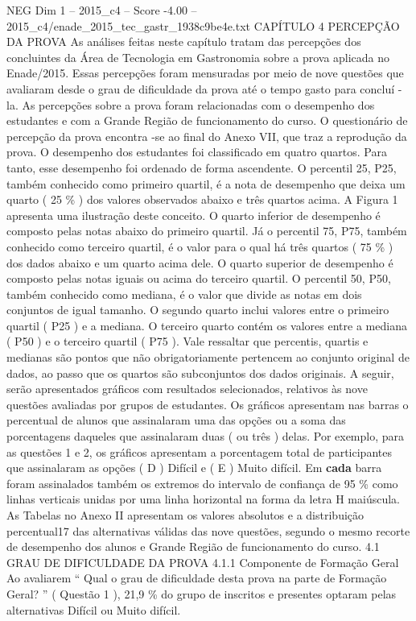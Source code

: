 \begin{textsample}{NEG Dim 1 – 2015\_c4 – Score -4.00 – 2015\_c4/enade\_2015\_tec\_gastr\_1938c9be4e.txt}  \label{ex:f1_neg_109}
CAPÍTULO 4 PERCEPÇÃO DA PROVA As análises feitas neste capítulo tratam das percepções dos concluintes da Área de Tecnologia em Gastronomia sobre a prova aplicada no Enade/2015.
Essas percepções foram mensuradas por meio de nove questões que avaliaram desde o grau de dificuldade da prova até o tempo gasto para concluí -la.
As percepções sobre a prova foram relacionadas com o desempenho dos estudantes e com a Grande Região de funcionamento do curso.
O questionário de percepção da prova encontra -se ao final do Anexo VII, que traz a reprodução da prova.
O desempenho dos estudantes foi classificado em quatro quartos.
Para tanto, esse desempenho foi ordenado de forma ascendente.
O percentil 25, P25, também conhecido como primeiro quartil, é a nota de desempenho que deixa um quarto ( 25 \% ) dos valores observados abaixo e três quartos acima.
A Figura 1 apresenta uma ilustração deste conceito.
O quarto inferior de desempenho é composto pelas notas abaixo do primeiro quartil.
Já o percentil 75, P75, também conhecido como terceiro quartil, é o valor para o qual há três quartos ( 75 \% ) dos dados abaixo e um quarto acima dele.
O quarto superior de desempenho é composto pelas notas iguais ou acima do terceiro quartil.
O percentil 50, P50, também conhecido como mediana, é o valor que divide as notas em dois conjuntos de igual tamanho.
O segundo quarto inclui valores entre o primeiro quartil ( P25 ) e a mediana.
O terceiro quarto contém os valores entre a mediana ( P50 ) e o terceiro quartil ( P75 ).
Vale ressaltar que percentis, quartis e medianas são pontos que não obrigatoriamente pertencem ao conjunto original de dados, ao passo que os quartos são subconjuntos dos dados originais.
A seguir, serão apresentados gráficos com resultados selecionados, relativos às nove questões avaliadas por grupos de estudantes.
Os gráficos apresentam nas barras o percentual de alunos que assinalaram uma das opções ou a soma das porcentagens daqueles que assinalaram duas ( ou três ) delas.
Por exemplo, para as questões 1 e 2, os gráficos apresentam a porcentagem total de participantes que assinalaram as opções ( D ) Difícil e ( E ) Muito difícil.
Em \textbf{cada} barra foram assinalados também os extremos do intervalo de confiança de 95 \% como linhas verticais unidas por uma linha horizontal na forma da letra H maiúscula.
As Tabelas no Anexo II apresentam os valores absolutos e a distribuição percentual17 das alternativas válidas das nove questões, segundo o mesmo recorte de desempenho dos alunos e Grande Região de funcionamento do curso. 4.1 GRAU DE DIFICULDADE DA PROVA 4.1.1 Componente de Formação Geral Ao avaliarem “ Qual o grau de dificuldade desta prova na parte de Formação Geral? ” ( Questão 1 ), 21,9 \% do grupo de inscritos e presentes optaram pelas alternativas Difícil ou Muito difícil.

\end{textsample}
